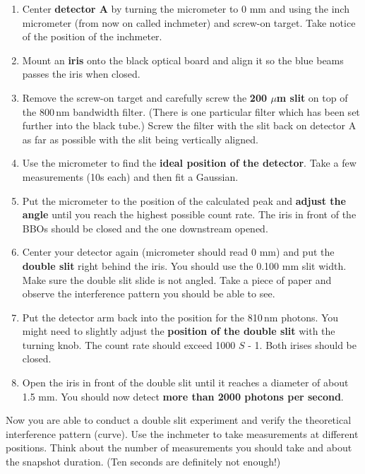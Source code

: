 \documentclass{../lab}
\begin{document}
\begin{enumerate}
    \item Center \textbf{detector A} by turning the micrometer to 0 mm and using the inch micrometer (from now on called inchmeter) and screw-on target. Take notice of the position of the inchmeter.

    \item Mount an \textbf{iris} onto the black optical board and align it so the blue beams passes the iris when closed.

    \item Remove the screw-on target and carefully screw the \textbf{200 $\mu$m slit} on top of the 800\,nm bandwidth filter. (There is one particular filter which has been set further into the black tube.) Screw the filter with the slit back on detector A as far as possible with the slit being vertically aligned.

    \item Use the micrometer to find the \textbf{ideal position of the detector}. Take a few measurements (10s each) and then fit a Gaussian.

    \item Put the micrometer to the position of the calculated peak and \textbf{adjust the angle} until you reach the highest possible count rate. The iris in front of the BBOs should be closed and the one downstream opened.

    \item Center your detector again (micrometer should read 0 mm) and put the \textbf{double slit} right behind the iris. You should use the 0.100 mm slit width. Make sure the double slit slide is not angled. Take a piece of paper and observe the interference pattern you should be able to see.

    \item Put the detector arm back into the position for the 810\,nm photons. You might need to slightly adjust the \textbf{position of the double slit} with the turning knob. The count rate should exceed 1000 $S$ - 1. Both irises should be closed.

    \item Open the iris in front of the double slit until it reaches a diameter of about 1.5 mm. You should now detect \textbf{more than 2000 photons per second}.

\end{enumerate}

Now you are able to conduct a double slit experiment and verify the theoretical interference pattern (curve). Use the inchmeter to take measurements at different positions. Think about the number of measurements you should take and about the snapshot duration. (Ten seconds are definitely not enough!)
\end{document}
